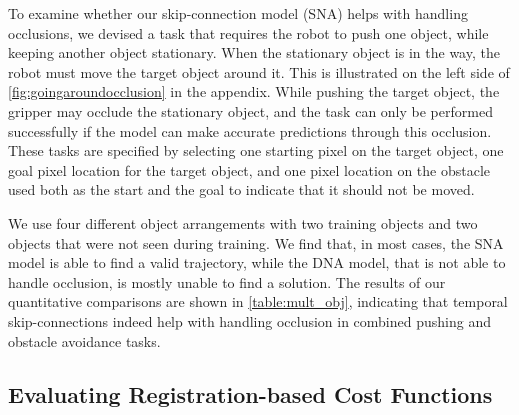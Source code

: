 To examine whether our skip-connection model (SNA) helps with handling occlusions, we devised a task that requires the robot to push one object, while keeping another object stationary. When the stationary object is in the way, the robot must move the target object around it. This is illustrated on the left side of \autoref{fig:goingaroundocclusion} in the appendix. While pushing the target object, the gripper may occlude the stationary object, and the task can only be performed successfully if the model can make accurate predictions through this occlusion. These tasks are specified by selecting one starting pixel on the target object, one goal pixel location for the target object, and one pixel location on the obstacle used both as the start and the goal to indicate that it should not be moved. %

We use four different object arrangements with two training objects and two objects that were not seen during training. We find that, in most cases, the SNA model is able to find a valid trajectory, while the DNA model, that is not able to handle occlusion, is mostly unable to find a solution. The results of our quantitative comparisons are shown in \autoref{table:mult_obj}, indicating that temporal skip-connections indeed help with handling occlusion in combined pushing and obstacle avoidance tasks. 

\subsection{Evaluating Registration-based Cost Functions}
\label{susbsec:reg_cost_exp}

